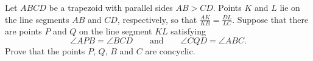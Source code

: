 Let $ABCD$ be a trapezoid with parallel sides $AB > CD$. Points $K$ and $L$ lie on the line segments $AB$ and $CD$, respectively, so that $\frac{AK}{KB} = \frac{DL}{LC}$. Suppose that there are points $P$ and $Q$ on the line segment $KL$ satisfying
\[
\angle APB = \angle BCD \qquad \text{and} \qquad \angle CQD = \angle ABC.
\]
Prove that the points $P$, $Q$, $B$ and $C$ are concyclic.
